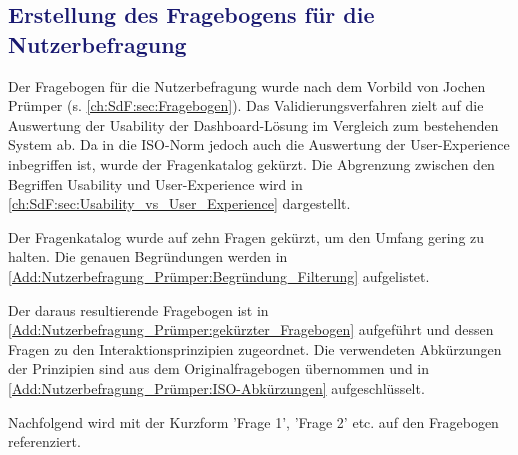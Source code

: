 \subsection{\textcolor{MidnightBlue}{Erstellung des Fragebogens für die Nutzerbefragung}}
\label{ch:Validierung:sec:Material:Nutzerbefragung}
Der Fragebogen für die Nutzerbefragung wurde nach dem Vorbild von Jochen Prümper (s. \autoref{ch:SdF:sec:Fragebogen}). Das Validierungsverfahren zielt auf die Auswertung der Usability der Dashboard-Lösung im Vergleich zum bestehenden System ab. Da in die ISO-Norm jedoch auch die Auswertung der User-Experience inbegriffen ist, wurde der Fragenkatalog gekürzt. Die Abgrenzung zwischen den Begriffen Usability und User-Experience wird in \autoref{ch:SdF:sec:Usability_vs_User_Experience} dargestellt.

Der Fragenkatalog wurde auf zehn Fragen gekürzt, um den Umfang gering zu halten. Die genauen Begründungen werden in \autoref{Add:Nutzerbefragung_Prümper:Begründung_Filterung} aufgelistet.

Der daraus resultierende Fragebogen ist in \autoref{Add:Nutzerbefragung_Prümper:gekürzter_Fragebogen} aufgeführt und dessen Fragen zu den Interaktionsprinzipien zugeordnet. Die verwendeten Abkürzungen der Prinzipien sind aus dem Originalfragebogen übernommen und in \autoref{Add:Nutzerbefragung_Prümper:ISO-Abkürzungen} aufgeschlüsselt.

Nachfolgend wird mit der Kurzform 'Frage 1', 'Frage 2' etc. auf den Fragebogen referenziert.


